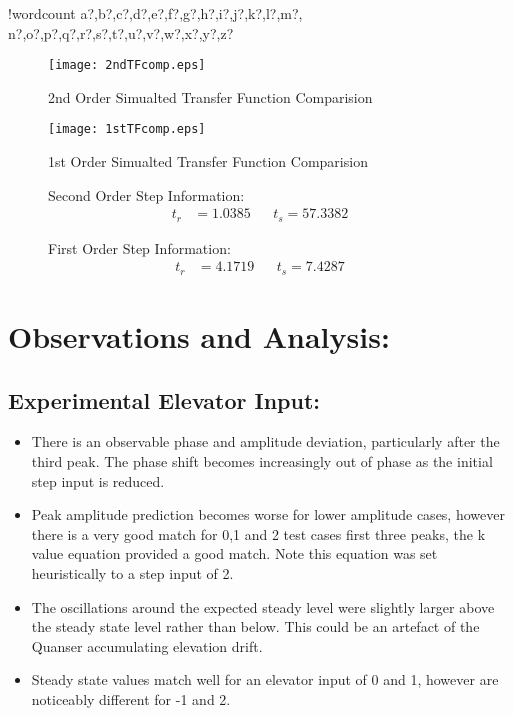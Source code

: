 \documentclass[11pt]{article}
\providecommand{\tightlist}{%
  \setlength{\itemsep}{0pt}\setlength{\parskip}{0pt}}
\newcounter{words}
\newenvironment{counted}{%
  \setcounter{words}{0}
  \SearchList!{wordcount}{\stepcounter{words}}
    {a?,b?,c?,d?,e?,f?,g?,h?,i?,j?,k?,l?,m?,
    n?,o?,p?,q?,r?,s?,t?,u?,v?,w?,x?,y?,z?}
  \UndoBoundary{'}
  \SearchOrder{p;}}{%
  \StopSearching}
\begin{document}
\begin{counted}
\begin{figure}[H]
\centering
\begin{minipage}{.49\textwidth}
\centering
\texttt{[image: 2ndTFcomp.eps]}
\caption{2nd Order Simualted Transfer Function Comparision}
\label{2ndTFcomp}
\end{minipage}
\hfill
\begin{minipage}{.49\textwidth}
  \centering
  \texttt{[image: 1stTFcomp.eps]}
  \caption{1st Order Simualted Transfer Function Comparision}
  \label{1stTFcomp}
\end{minipage}
\vspace{-11pt}
\end{figure}

\begin{figure}[H]
\centering
\begin{minipage}{.49\textwidth}
Second Order Step Information:
\begin{align*}
t_r &= 1.0385 &&t_s = 57.3382
\end{align*}
\end{minipage}
\hfill
\begin{minipage}{.49\textwidth}
First Order Step Information:
\begin{align*}
t_r &= 4.1719 &&t_s = 7.4287
\end{align*}
\end{minipage}
\vspace{-11pt}
\end{figure}

\section{Observations and Analysis:}\label{observations-and-analysis}

\subsection{Experimental Elevator
Input:}\label{experimental-elevator-input}

\begin{itemize}
\tightlist
\item
  There is an observable phase and amplitude deviation, particularly
  after the third peak. The phase shift becomes increasingly out of
  phase as the initial step input is reduced.
\item
  Peak amplitude prediction becomes worse for lower amplitude cases,
  however there is a very good match for 0,1 and 2 test cases first
  three peaks, the k value equation provided a good match. Note this
  equation was set heuristically to a step input of 2.
\item
  The oscillations around the expected steady level were slightly larger
  above the steady state level rather than below. This could be an
  artefact of the Quanser accumulating elevation drift.
\item
  Steady state values match well for an elevator input of 0 and 1,
  however are noticeably different for -1 and 2.
\end{itemize}


\end{counted}
\end{document}
